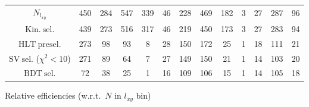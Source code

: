 \documentclass[10pt,a4paper]{article}
\begin{document}
\begin{landscape}
{\begin{tabular}{c|cccc|cccc|cccc}
\midrule
$N_{l_{xy}}$ & 450 & 284 & 547 & 339 & 46 & 228 & 469 & 182 & 3 & 27 & 287 & 96\\
$\mathrm{Kin.\ sel.}$ & 439 & 273 & 516 & 317 & 46 & 219 & 450 & 173 & 3 & 27 & 283 & 94\\
$\mathrm{HLT\ presel.}$ & 273 & 98 & 93 & 8 & 28 & 150 & 172 & 25 & 1 & 18 & 111 & 21\\
$\mathrm{SV\ sel.}$ ($\chi^2{<}10$) & 271 & 89 & 64 & 7 & 27 & 149 & 150 & 21 & 1 & 14 & 103 & 20\\
$\mathrm{BDT\ sel.}$ & 72 & 38 & 25 & 1 & 16 & 109 & 106 & 15 & 1 & 14 & 105 & 18\\
\bottomrule
\end{tabular}}

\vspace{18pt}

Relative efficiencies (w.r.t.\ $N$ in $l_{xy}$ bin)


\end{landscape}
\end{document}
